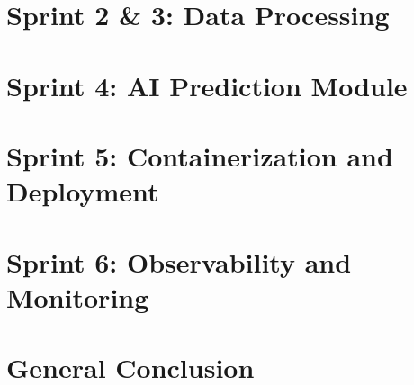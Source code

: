     \chapter{Sprint 2 \& 3: Data Processing}
    

    \chapter{Sprint 4: AI Prediction Module}
    

    \chapter{Sprint 5: Containerization and Deployment}
    

    \chapter{Sprint 6: Observability and Monitoring}
    

    \chapter*{General Conclusion}
    


    \printbibliography[title={Webography}]

